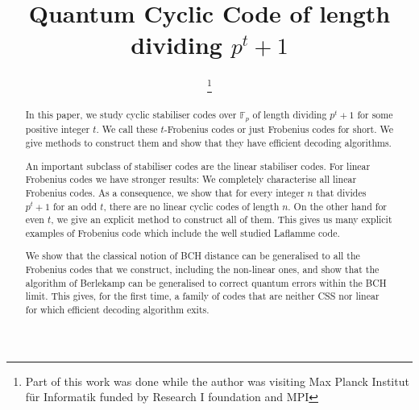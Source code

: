 \documentclass[conference]{IEEEtran}
\renewcommand{\=}{\approx}
\begin{document}
\IEEEoverridecommandlockouts
\title{Quantum Cyclic Code of length dividing $p^{t}+1$}
\author{\thanks{Part of this work was done while the author was visiting  Max Planck Institut f\"ur Informatik funded by Research I foundation and MPI}
 \and
  }
\date{} \maketitle

\newcommand{\etal}[0]{\emph{et al}}

\begin{abstract}

  In this paper, we study cyclic stabiliser codes over $\mathbb{F}_p$
  of length dividing $p^t+1$ for some positive integer $t$. We call
  these $t$-Frobenius codes or just Frobenius codes for short. We give
  methods to construct them and show that they have efficient decoding
  algorithms.

  An important subclass of stabiliser codes are the linear stabiliser
  codes. For linear Frobenius codes we have stronger results: We
  completely characterise all linear Frobenius codes. As a
  consequence, we show that for every integer $n$ that divides $p^t+1$
  for an odd $t$, there are no linear cyclic codes of length $n$. On
  the other hand for even $t$, we give an explicit method to construct
  all of them. This gives us many explicit examples of Frobenius
  code which include the well studied Laflamme code.

  We show that the classical notion of BCH distance can be generalised
  to all the Frobenius codes that we construct, including the
  non-linear ones, and show that the algorithm of Berlekamp can be
  generalised to correct quantum errors within the BCH limit. This
  gives, for the first time, a family of codes that are neither CSS
  nor linear for which efficient decoding algorithm exits.


\end{abstract}
\end{document}
